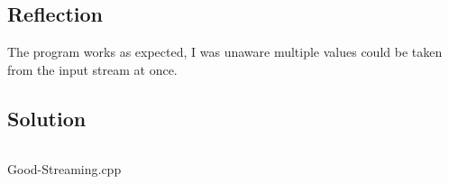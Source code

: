 \documentclass[Lab-B.tex]{subfiles}
\begin{document}
        \subsection{Reflection}
            The program works as expected, I was unaware multiple values could be taken
            from the input stream at once.
        
        \subsection{Solution}
            \begin{listing}[H]
                \inputminted{cpp}{../Tasks/01-Good-Streaming/Good-Streaming.cpp}%
                \caption{Good-Streaming.cpp}
            \end{listing}
\end{document}
